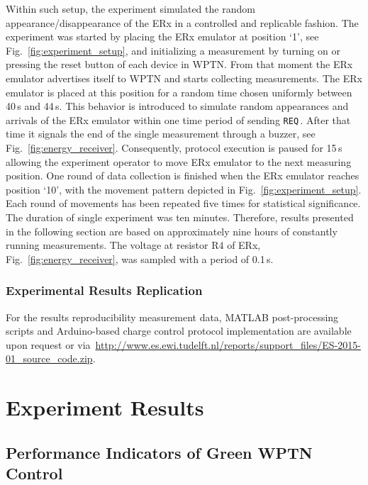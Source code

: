 \documentclass[11pt,draftclsnofoot,journal,onecolumn]{IEEEtran}
\newcommand{\textsubscript}[1]{}
\newcommand{\chargingRequest}{\texttt{REQ\textsubscript{CRG}}\,}
\begin{document}
Within such setup, the experiment simulated the random appearance/disappearance of the ERx in a controlled and replicable fashion. The experiment was started by placing the ERx emulator at position `1', see Fig.~\ref{fig:experiment_setup}, and initializing a measurement by turning on or pressing the reset button of each device in WPTN. From that moment the ERx emulator advertises itself to WPTN and starts collecting measurements. The ERx emulator is placed at this position for a random time chosen uniformly between 40\,s and 44\,s. This behavior is introduced to simulate random appearances and arrivals of the ERx emulator within one time period of sending \chargingRequest. After that time it signals the end of the single measurement through a buzzer, see Fig.~\ref{fig:energy_receiver}. Consequently, protocol execution is paused for 15\,s allowing the experiment operator to move ERx emulator to the next measuring position. One round of data collection is finished when the ERx emulator reaches position `10', with the movement pattern depicted in Fig.~\ref{fig:experiment_setup}. Each round of movements has been repeated five times for statistical significance. The duration of single experiment was ten minutes. Therefore, results presented in the following section are based on approximately nine hours of constantly running measurements. The voltage at resistor R4 of ERx, Fig.~\ref{fig:energy_receiver}, was sampled with a period of 0.1\,s.

\subsubsection{Experimental Results Replication}
\label{sec:experiment_result_replication}

For the results reproducibility measurement data, MATLAB post-processing scripts and Arduino-based charge control protocol implementation are available upon request or via~\url{http://www.es.ewi.tudelft.nl/reports/support_files/ES-2015-01_source_code.zip}.

\section{Experiment Results}
\label{sec:experiment_result}

\subsection{Performance Indicators of Green WPTN Control}
\label{sec:performance_descriptors}
\end{document}
